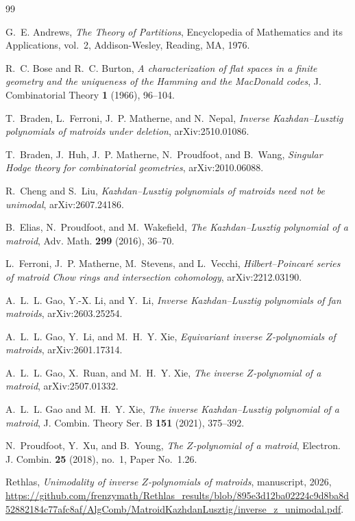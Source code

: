 \documentclass{amsart}
\theoremstyle{remark}
\numberwithin{equation}{section}
\begin{document}
\begin{thebibliography}{99}

G.~E. Andrews, \emph{The Theory of Partitions}, Encyclopedia of Mathematics and its Applications, vol.~2, Addison-Wesley, Reading, MA, 1976.

R.~C. Bose and R.~C. Burton, \emph{A characterization of flat spaces in a finite geometry and the uniqueness of the Hamming and the MacDonald codes}, J. Combinatorial Theory \textbf{1} (1966), 96--104.

T.~Braden, L.~Ferroni, J.~P. Matherne, and N.~Nepal, \emph{Inverse Kazhdan--Lusztig polynomials of matroids under deletion}, arXiv:2510.01086.

T.~Braden, J.~Huh, J.~P. Matherne, N.~Proudfoot, and B.~Wang, \emph{Singular Hodge theory for combinatorial geometries}, arXiv:2010.06088.

R.~Cheng and S.~Liu, \emph{Kazhdan--Lusztig polynomials of matroids need not be unimodal}, arXiv:2607.24186.

B.~Elias, N.~Proudfoot, and M.~Wakefield, \emph{The Kazhdan--Lusztig polynomial of a matroid}, Adv. Math. \textbf{299} (2016), 36--70.

L.~Ferroni, J.~P. Matherne, M.~Stevens, and L.~Vecchi, \emph{Hilbert--Poincar\'e series of matroid Chow rings and intersection cohomology}, arXiv:2212.03190.

A.~L.~L. Gao, Y.-X. Li, and Y.~Li, \emph{Inverse Kazhdan--Lusztig polynomials of fan matroids}, arXiv:2603.25254.

A.~L.~L. Gao, Y.~Li, and M.~H.~Y. Xie, \emph{Equivariant inverse $Z$-polynomials of matroids}, arXiv:2601.17314.

A.~L.~L. Gao, X.~Ruan, and M.~H.~Y. Xie, \emph{The inverse $Z$-polynomial of a matroid}, arXiv:2507.01332.

A.~L.~L. Gao and M.~H.~Y. Xie, \emph{The inverse Kazhdan--Lusztig polynomial of a matroid}, J. Combin. Theory Ser. B \textbf{151} (2021), 375--392.

N.~Proudfoot, Y.~Xu, and B.~Young, \emph{The $Z$-polynomial of a matroid}, Electron. J. Combin. \textbf{25} (2018), no.~1, Paper No.~1.26.

{\raggedright Rethlas, \emph{Unimodality of inverse $Z$-polynomials of matroids}, manuscript, 2026, \url{https://github.com/frenzymath/Rethlas_results/blob/895e3d12ba02224c9d8ba8d52882184c77afc8af/AlgComb/MatroidKazhdanLusztig/inverse_z_unimodal.pdf}.\par}

\end{thebibliography}
\end{document}

